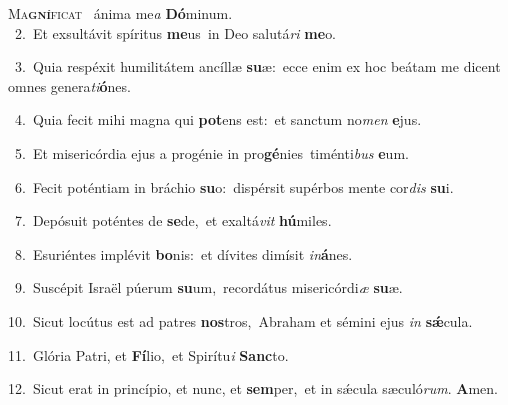 \lettrine{\initial\textcolor{\initialcolor}{M}}{a\-\textbf{gní}\-ficat~\star} ánima me\textit{a} \textbf{Dó}\-minum.\\
{\numbfont\textcolor{\numbcolor}{~2.}}~Et exsultávit spíritus \textbf{me}\-us~\star in Deo salutá\textit{ri} \textbf{me}\-o.\par
{\numbfont\textcolor{\numbcolor}{~3.}}~Quia respéxit humilitátem ancíllæ \textbf{su}\-æ:~\star ecce enim ex hoc beátam me dicent omnes genera\-\textit{ti}\-\textbf{ó}nes.\par
{\numbfont\textcolor{\numbcolor}{~4.}}~Quia fecit mihi magna qui \textbf{pot}\-ens est:~\star et sanctum no\textit{men} \textbf{e}\-jus.\par
{\numbfont\textcolor{\numbcolor}{~5.}}~Et misericórdia ejus a progénie in pro\-\textbf{gé}\-nies~\star timénti\textit{bus} \textbf{e}\-um.\par
{\numbfont\textcolor{\numbcolor}{~6.}}~Fecit poténtiam in bráchio \textbf{su}\-o:~\star dispérsit supérbos mente cor\textit{dis} \textbf{su}\-i.\par
{\numbfont\textcolor{\numbcolor}{~7.}}~Depósuit poténtes de \textbf{se}\-de,~\star et exaltá\textit{vit} \textbf{hú}\-miles.\par
{\numbfont\textcolor{\numbcolor}{~8.}}~Esuriéntes implévit \textbf{bo}\-nis:~\star et dívites dimísit \textit{in}\-\textbf{á}nes.\par
{\numbfont\textcolor{\numbcolor}{~9.}}~Suscépit Israël púerum \textbf{su}\-um,~\star recordátus misericórdi\textit{æ} \textbf{su}\-æ.\par
{\numbfont\textcolor{\numbcolor}{10.}}~Sicut locútus est ad patres \textbf{nos}\-tros,~\star Abraham et sémini ejus \textit{in} \textbf{sǽ}\-cula.\par
{\numbfont\textcolor{\numbcolor}{11.}}~Glória Patri, et \textbf{Fí}\-lio,~\star et Spirítu\textit{i} \textbf{Sanc}\-to.\par
{\numbfont\textcolor{\numbcolor}{12.}}~Sicut erat in princípio, et nunc, et \textbf{sem}\-per,~\star et in sǽcula sæculó\-\textit{rum}\-. \textbf{A}\-men.\par

